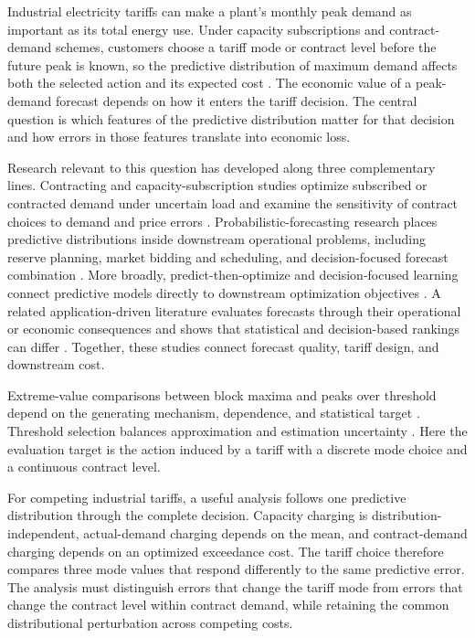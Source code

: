\documentclass[suppldata]{interact}
\begin{document}
Industrial electricity tariffs can make a plant's monthly peak demand
as important as its total energy use. Under capacity subscriptions and
contract-demand schemes, customers choose a tariff mode or contract
level before the future peak is known, so the predictive distribution
of maximum demand affects both the selected action and its expected
cost \citep{BjarghovEtAl2022,WuEtAl2022,LimaEtAl2026,SungKwon2026}.
The economic value of a peak-demand forecast depends on how it enters
the tariff decision. The central question is which features of the predictive
distribution matter for that decision and how errors in those features
translate into economic loss.

Research relevant to this question has developed along three
complementary lines. Contracting and capacity-subscription studies
optimize subscribed or contracted demand under uncertain load and
examine the sensitivity of contract choices to demand and price errors
\citep{BjarghovEtAl2022,WuEtAl2022,FerdavaniEtAl2018,FerdavaniHooshmand2019,LimaEtAl2026}.
Probabilistic-forecasting research places predictive distributions
inside downstream operational problems, including reserve planning,
market bidding and scheduling, and decision-focused forecast
combination
\citep{WangEtAl2023,BeykirchEtAl2024,StratigakosEtAl2025}.
More broadly, predict-then-optimize and decision-focused learning
connect predictive models directly to downstream optimization
objectives
\citep{ElmachtoubGrigas2022,MandiEtAl2024}.
A related application-driven literature evaluates forecasts through
their operational or economic consequences and shows that statistical
and decision-based rankings can differ
\citep{MaciejowskaEtAl2026,HoubenEtAl2026}.
Together, these studies connect forecast quality, tariff design, and
downstream cost.

Extreme-value comparisons between block maxima and peaks over threshold
depend on the generating mechanism, dependence, and statistical target
\citep{BuecherZhou2021}. Threshold selection balances approximation
and estimation uncertainty \citep{ScarrottMacDonald2012}. Here the
evaluation target is the action induced by a tariff with a discrete
mode choice and a continuous contract level.

For competing industrial tariffs, a useful analysis follows one
predictive distribution through the complete decision. Capacity
charging is distribution-independent, actual-demand charging depends
on the mean, and contract-demand charging depends on an optimized
exceedance cost. The tariff choice therefore compares three mode values
that respond differently to the same predictive error. The analysis
must distinguish errors that change the tariff mode from errors that
change the contract level within contract demand, while retaining the
common distributional perturbation across competing costs.
\end{document}
